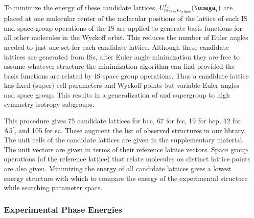 \documentclass[preprint]{iucr}              %
\newcommand{\mb}[1]{\ensuremath{\mbox{\boldmath $ #1 $}}}
\begin{document}
To minimize the energy of these candidate lattices,
$U^{\ell_i}_{m_\tau n_\sigma}(\mb{\omega}_i)$ are placed at one
molecular center of the molecular positions of the lattice of each
IS and space group operations of the IS are applied to generate
basis functions for all other molecules in the Wyckoff orbit. This
reduces the number of Euler angles needed to just one set for each
candidate lattice. Although these candidate lattices are generated
from ISs, after Euler angle minimization they are free to assume
whatever structure the minimization algorithm can find provided the
basis functions are related by IS space group operations. Thus a
candidate lattice has fixed (super) cell parameters and Wyckoff
points but variable Euler angles and space group. This results in a
generalization of and supergroup to high symmetry isotropy
subgroups.

This procedure gives 75 candidate lattices for bcc, 67 for fcc, 19
for hcp, 12 for A5$^\prime$, and 105 for sc. These augment the list
of observed structures in our library. The unit cells of the
candidate lattices are given in the supplementary material. The unit
vectors are given in terms of their reference lattice vectors. Space
group operations (of the reference lattice) that relate molecules on
distinct lattice points are also given. Minimizing the energy of all
candidate lattices gives a lowest energy structure with which to
compare the energy of the experimental structure while searching
parameter space.



\subsubsection{Experimental Phase Energies}
\end{document}

